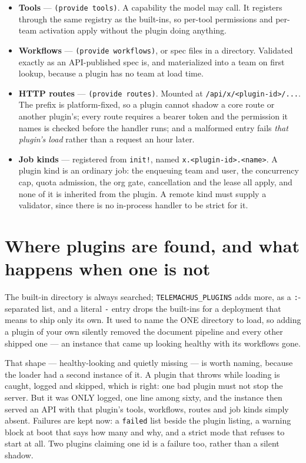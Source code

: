 \documentclass[11pt,a4paper]{report}
\begin{document}
\begin{itemize}
\item \textbf{Tools} --- \texttt{(provide tools)}. A capability the model may call. It registers through the same registry as the built-ins, so per-tool permissions and per-team activation apply without the plugin doing anything.
\item \textbf{Workflows} --- \texttt{(provide workflows)}, or spec files in a directory. Validated exactly as an API-published spec is, and materialized into a team on first lookup, because a plugin has no team at load time.
\item \textbf{HTTP routes} --- \texttt{(provide routes)}. Mounted at \texttt{/api/x/<plugin-id>/...}. The prefix is platform-fixed, so a plugin cannot shadow a core route or another plugin's; every route requires a bearer token and the permission it names is checked before the handler runs; and a malformed entry fails \emph{that plugin's load} rather than a request an hour later.
\item \textbf{Job kinds} --- registered from \texttt{init!}, named \texttt{x.<plugin-id>.<name>}. A plugin kind is an ordinary job: the enqueuing team and user, the concurrency cap, quota admission, the org gate, cancellation and the lease all apply, and none of it is inherited from the plugin. A remote kind must supply a validator, since there is no in-process handler to be strict for it.
\end{itemize}

\section{Where plugins are found, and what happens when one is not}

The built-in directory is always searched; \texttt{TELEMACHUS\_PLUGINS} adds more, as a \texttt{:}-separated list, and a literal \texttt{-} entry drops the built-ins for a deployment that means to ship only its own. It used to name the ONE directory to load, so adding a plugin of your own silently removed the document pipeline and every other shipped one --- an instance that came up looking healthy with its workflows gone.

That shape --- healthy-looking and quietly missing --- is worth naming, because the loader had a second instance of it. A plugin that throws while loading is caught, logged and skipped, which is right: one bad plugin must not stop the server. But it was ONLY logged, one line among sixty, and the instance then served an API with that plugin's tools, workflows, routes and job kinds simply absent. Failures are kept now: a \texttt{failed} list beside the plugin listing, a warning block at boot that says how many and why, and a strict mode that refuses to start at all. Two plugins claiming one id is a failure too, rather than a silent shadow.
\end{document}
